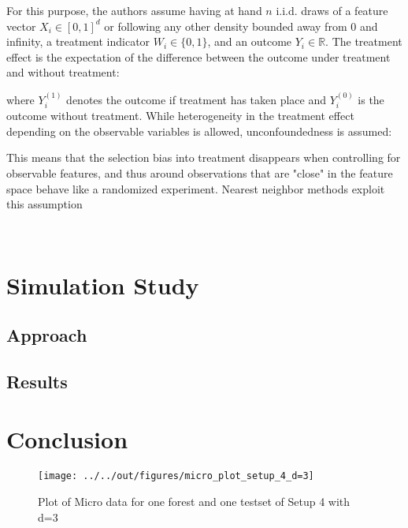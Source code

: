 \documentclass[11pt, a4paper, leqno]{article}
\begin{document}
For this purpose, the authors assume having at hand \(n\) i.i.d. draws of a feature vector \(X_i \in [0,1]^d\) or following any other density bounded away from 0 and infinity, a treatment indicator \(W_i \in \{0,1\}\), and an outcome \(Y_i \in \mathbb{R}\).
The treatment effect is the expectation of the difference between the outcome under treatment and without treatment:

where \(Y_i^{(1)}\) denotes the outcome if treatment has taken place and \(Y_i^{(0)}\) is the outcome without treatment.
While heterogeneity in the treatment effect depending on the observable variables is allowed, unconfoundedness is assumed:

This means that the selection bias into treatment disappears when controlling for observable features, and thus around observations that are "close" in the feature space behave like a randomized experiment. Nearest neighbor methods exploit this assumption
\(\) \(\) \(\) 







 \(\) \(\) \(\) \(\) \(\) 


\section{Simulation Study} %
\label{sec:simulation}

\subsection{Approach} %
\label{sec:sim_approach}



\subsection{Results} %
\label{sec:sim_results}
    




\section{Conclusion} %
\label{sec:conclusion}

\begin{figure}
    \caption{Plot of Micro data for one forest and one testset of Setup 4 with d=3}
    
    \texttt{[image: ../../out/figures/micro\_plot\_setup\_4\_d=3]}

\end{figure}




\pagebreak










\end{document}
